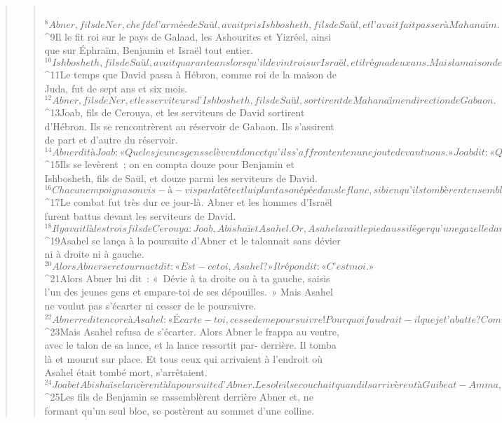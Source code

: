 \begin{verse}
\begin{verse}
         
${}^{8}Abner, fils de Ner, chef de l’armée de Saül, avait pris Ishbosheth, fils de Saül, et l’avait fait passer à Mahanaïm. 
${}^{9}Il le fit roi sur le pays de Galaad, les Ashourites et Yizréel, ainsi que sur Éphraïm, Benjamin et Israël tout entier. 
${}^{10}Ishbosheth, fils de Saül, avait quarante ans lorsqu’il devint roi sur Israël, et il régna deux ans. Mais la maison de Juda s’était ralliée à David. 
${}^{11}Le temps que David passa à Hébron, comme roi de la maison de Juda, fut de sept ans et six mois.
${}^{12}Abner, fils de Ner, et les serviteurs d’Ishbosheth, fils de Saül, sortirent de Mahanaïm en direction de Gabaon. 
${}^{13}Joab, fils de Cerouya, et les serviteurs de David sortirent d’Hébron. Ils se rencontrèrent au réservoir de Gabaon. Ils s’assirent de part et d’autre du réservoir. 
${}^{14}Abner dit à Joab : « Que les jeunes gens se lèvent donc et qu’ils s’affrontent en une joute devant nous. » Joab dit : « Qu’ils se lèvent ! » 
${}^{15}Ils se levèrent ; on en compta douze pour Benjamin et Ishbosheth, fils de Saül, et douze parmi les serviteurs de David. 
${}^{16}Chacun empoigna son vis-à-vis par la tête et lui planta son épée dans le flanc, si bien qu’ils tombèrent ensemble. On appela ce lieu « le Champ des Flancs ». Il se trouve à Gabaon.
${}^{17}Le combat fut très dur ce jour-là. Abner et les hommes d’Israël furent battus devant les serviteurs de David. 
${}^{18}Il y avait là les trois fils de Cerouya : Joab, Abishaï et Asahel. Or, Asahel avait le pied aussi léger qu’une gazelle dans la campagne. 
${}^{19}Asahel se lança à la poursuite d’Abner et le talonnait sans dévier ni à droite ni à gauche. 
${}^{20}Alors Abner se retourna et dit : « Est-ce toi, Asahel ? » Il répondit : « C’est moi. » 
${}^{21}Alors Abner lui dit : « Dévie à ta droite ou à ta gauche, saisis l’un des jeunes gens et empare-toi de ses dépouilles. » Mais Asahel ne voulut pas s’écarter ni cesser de le poursuivre. 
${}^{22}Abner redit encore à Asahel : « Écarte-toi, cesse de me poursuivre ! Pourquoi faudrait-il que je t’abatte ? Comment pourrais-je alors regarder en face ton frère Joab ? » 
${}^{23}Mais Asahel refusa de s’écarter. Alors Abner le frappa au ventre, avec le talon de sa lance, et la lance ressortit par- derrière. Il tomba là et mourut sur place. Et tous ceux qui arrivaient à l’endroit où Asahel était tombé mort, s’arrêtaient.
${}^{24}Joab et Abishaï se lancèrent à la poursuite d’Abner. Le soleil se couchait quand ils arrivèrent à Guibeat-Amma, qui se trouve à l’est de Guiah, en direction du désert de Gabaon. 
${}^{25}Les fils de Benjamin se rassemblèrent derrière Abner et, ne formant qu’un seul bloc, se postèrent au sommet d’une colline. 

\end{verse}
\end{verse}
